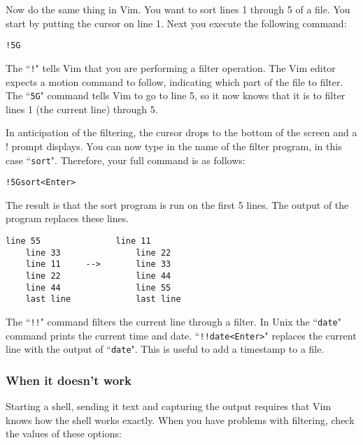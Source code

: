 Now do the same thing in Vim.
You want to sort lines 1 through 5 of a file.
You start by putting the cursor on line 1.
Next you execute the following command:

\begin{Verbatim}[samepage=true]
 !5G
\end{Verbatim}

The ``\texttt{!}" tells Vim that you are performing a filter operation.
The Vim editor expects a motion command to follow, indicating which part of the file to filter.
The ``\texttt{5G}" command tells Vim to go to line 5, so it now knows that it is to filter lines 1 (the current line) through 5.

In anticipation of the filtering, the cursor drops to the bottom of the screen and a ! prompt displays.
You can now type in the name of the filter program, in this case ``\texttt{sort}".
Therefore, your full command is as follows:

\begin{Verbatim}[samepage=true]
 !5Gsort<Enter>
\end{Verbatim}

The result is that the sort program is run on the first 5 lines.
The output of the program replaces these lines.

\begin{Verbatim}[samepage=true]
    line 55               line 11
    line 33               line 22
    line 11     -->       line 33
    line 22               line 44
    line 44               line 55
    last line             last line
\end{Verbatim}

The ``\texttt{!!}" command filters the current line through a filter.
In Unix the ``\texttt{date}" command prints the current time and date.
``\texttt{!!date<Enter>}" replaces the current line with the output of ``\texttt{date}".
This is useful to add a timestamp to a file.

\subsubsection{When it doesn't work}
Starting a shell, sending it text and capturing the output requires that Vim knows how the shell works exactly.
When you have problems with filtering, check the values of these options:


